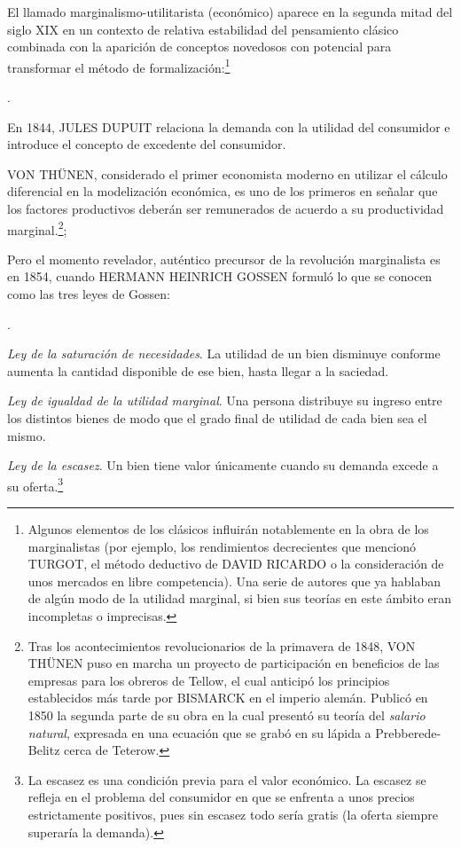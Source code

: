 \documentclass[10pt,a4paper]{article}
\newcounter{numitem}
\newenvironment{lnum}
 {\begin{list}{\arabic{numitem}.}{%
  \usecounter{numitem}%
  \setlength{\leftmargin}{1cm}%
  \setlength{\parskip}{3pt}%
  \setlength{\itemsep}{0pt}%
  \setlength{\parsep}{0pt}%
 }}
 {\end{list}}
\begin{document}
El llamado marginalismo-utilitarista (económico) aparece en la segunda mitad del siglo XIX en un contexto de relativa estabilidad del pensamiento clásico combinada con la aparición de conceptos novedosos con potencial para transformar el método de formalización:\footnote{%
    Algunos elementos de los clásicos influirán notablemente en la obra de los marginalistas (por ejemplo, los rendimientos decrecientes que mencionó TURGOT, el método deductivo de DAVID RICARDO o la consideración de unos mercados en libre competencia). Una serie de autores que ya hablaban de algún modo de la utilidad marginal, si bien sus teorías en este ámbito eran incompletas o imprecisas.
}
\begin{lnum}
    \item En 1844, JULES DUPUIT relaciona la demanda con la utilidad del consumidor e introduce el concepto de excedente del consumidor.
    \item VON THÜNEN, considerado el primer economista moderno en utilizar el cálculo diferencial en la modelización económica, es uno de los primeros en señalar que los factores productivos deberán ser remunerados de acuerdo a su productividad marginal.\footnote{%
        Tras los acontecimientos revolucionarios de la primavera de 1848, VON THÜNEN puso en marcha un proyecto de participación en beneficios de las empresas para los obreros de Tellow, el cual anticipó los principios establecidos más tarde por BISMARCK en el imperio alemán. Publicó en 1850 la segunda parte de su obra en la cual presentó su teoría del \textit{salario natural}, expresada en una ecuación que se grabó en su lápida a Prebberede-Belitz cerca de Teterow.
    };
    \item Pero el momento revelador, auténtico precursor de la revolución marginalista es en 1854, cuando HERMANN HEINRICH GOSSEN formuló lo que se conocen como las tres leyes de Gossen:
    \begin{lnum}
     \item \textit{Ley de la saturación de necesidades}. La utilidad de un bien disminuye conforme aumenta la cantidad disponible de ese bien, hasta llegar a la saciedad.
     \item \textit{Ley de igualdad de la utilidad marginal}. Una persona distribuye su ingreso entre los distintos bienes de modo que el grado final de utilidad de cada bien sea el mismo.
     \item \textit{Ley de la escasez}. Un bien tiene valor únicamente cuando su demanda excede a su oferta.\footnote{%
         La escasez es una condición previa para el valor económico. La escasez se refleja en el problema del consumidor en que se enfrenta a unos precios estrictamente positivos, pues sin escasez todo sería gratis (la oferta siempre superaría la demanda).
     }
    \end{lnum}
\end{lnum}
\end{document}
